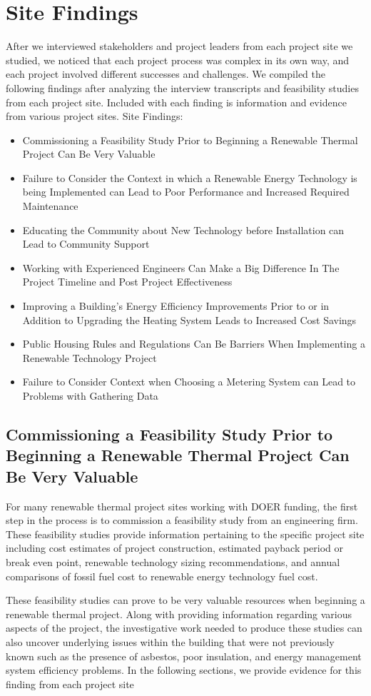 \section{Site Findings}
\par After we interviewed stakeholders and project leaders from each project site we studied, we noticed that each project process was complex in its own way, and each project involved different successes and challenges. We compiled the following findings after analyzing the interview transcripts and feasibility studies from each project site. Included with each finding is information and evidence from various project sites.
Site Findings:
  \begin{itemize}
    \item{Commissioning a Feasibility Study Prior to Beginning a Renewable Thermal Project Can Be Very Valuable}
    \item{Failure to Consider the Context in which a Renewable Energy Technology is being Implemented can Lead to Poor Performance and Increased Required Maintenance}
    \item{Educating the Community about New Technology before Installation can Lead to Community Support}
    \item{Working with Experienced Engineers Can Make a Big Difference In The Project Timeline and Post Project Effectiveness}
    \item{Improving a Building’s Energy Efficiency Improvements Prior to or in Addition to Upgrading the Heating System Leads to Increased Cost Savings}
    \item{Public Housing Rules and Regulations Can Be Barriers When Implementing a Renewable Technology Project}
    \item{Failure to Consider Context when Choosing a Metering System can Lead to Problems with Gathering Data}
  \end{itemize}

\subsection{Commissioning a Feasibility Study Prior to Beginning a Renewable Thermal Project Can Be Very Valuable}
\par For many renewable thermal project sites working with DOER funding, the first step in the process is to commission a feasibility study from an engineering firm. These feasibility studies provide information pertaining to the specific project site including cost estimates of project construction, estimated payback period or break even point, renewable technology sizing recommendations, and annual comparisons of fossil fuel cost to renewable energy technology fuel cost.
\par These feasibility studies can prove to be very valuable resources when beginning a renewable thermal project. Along with providing information regarding various aspects of the project, the investigative work needed to produce these studies can also uncover underlying issues within the building that were not previously known such as the presence of asbestos, poor insulation, and energy management system efficiency problems. In the following sections, we provide evidence for this finding from each project site

